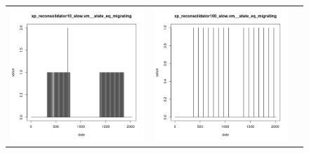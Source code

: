 \documentclass[parallelisme]{compas2017}
\begin{document}
\begin{figure}[h]
\begin{tabular}{ccc}
\includegraphics[scale=0.30]{xp_reconsolidator10_slow_vm__state_eq_migrating}&
\includegraphics[scale=0.30]{xp_reconsolidator100_slow_vm__state_eq_migrating}\\

	\end{tabular}
\end{figure}
\end{document}
